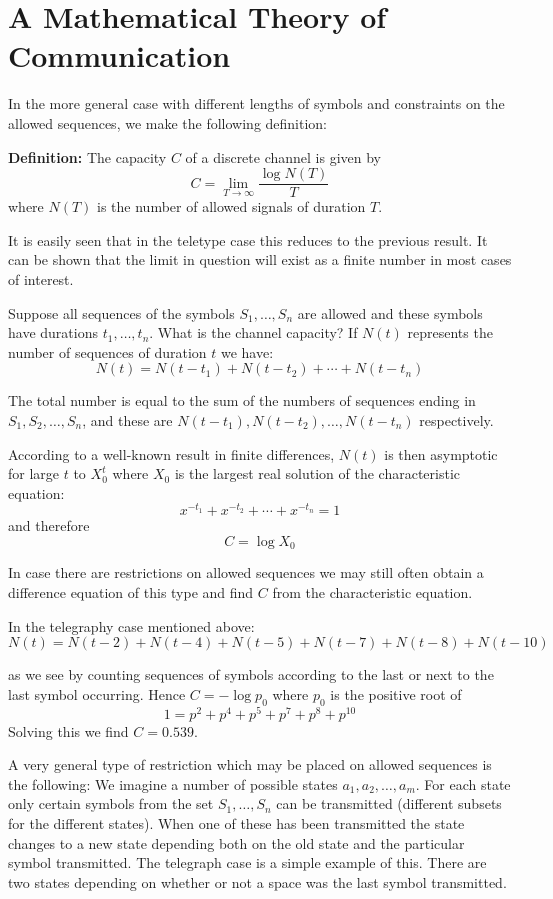 \documentclass{article}
\begin{document}
\section*{A Mathematical Theory of Communication}

In the more general case with different lengths of symbols and constraints on the allowed sequences, we make the following definition:

\medskip
\noindent
\textbf{Definition:} The capacity $C$ of a discrete channel is given by
\[
C = \lim_{T \to \infty} \frac{\log N(T)}{T}
\]
where $N(T)$ is the number of allowed signals of duration $T$.

\medskip
It is easily seen that in the teletype case this reduces to the previous result. It can be shown that the limit in question will exist as a finite number in most cases of interest.

Suppose all sequences of the symbols $S_1, \ldots, S_n$ are allowed and these symbols have durations $t_1, \ldots, t_n$. What is the channel capacity? If $N(t)$ represents the number of sequences of duration $t$ we have:
\[
N(t) = N(t - t_1) + N(t - t_2) + \cdots + N(t - t_n)
\]

The total number is equal to the sum of the numbers of sequences ending in $S_1, S_2, \ldots, S_n$, and these are $N(t - t_1), N(t - t_2), \ldots, N(t - t_n)$ respectively.

According to a well-known result in finite differences, $N(t)$ is then asymptotic for large $t$ to $X_0^t$ where $X_0$ is the largest real solution of the characteristic equation:
\[
x^{-t_1} + x^{-t_2} + \cdots + x^{-t_n} = 1
\]
and therefore
\[
C = \log X_0
\]

In case there are restrictions on allowed sequences we may still often obtain a difference equation of this type and find $C$ from the characteristic equation.

In the telegraphy case mentioned above:
\[
N(t) = N(t - 2) + N(t - 4) + N(t - 5) + N(t - 7) + N(t - 8) + N(t - 10)
\]

as we see by counting sequences of symbols according to the last or next to the last symbol occurring. Hence $C = -\log p_0$ where $p_0$ is the positive root of
\[
1 = p^2 + p^4 + p^5 + p^7 + p^8 + p^{10}
\]
Solving this we find $C = 0.539$.

\medskip
A very general type of restriction which may be placed on allowed sequences is the following: We imagine a number of possible states $a_1, a_2, \ldots, a_m$. For each state only certain symbols from the set $S_1, \ldots, S_n$ can be transmitted (different subsets for the different states). When one of these has been transmitted the state changes to a new state depending both on the old state and the particular symbol transmitted. The telegraph case is a simple example of this. There are two states depending on whether or not a space was the last symbol transmitted.
\end{document}
